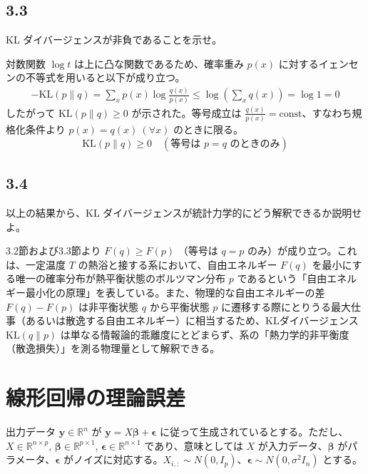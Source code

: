 \documentclass[11pt,a4paper,dvipdfmx]{article}
\numberwithin{equation}{section}
\newenvironment{note}[0]
{
    \begin{tcolorbox}[sharp corners, colframe=gray!20, colback=gray!20, width=\textwidth]
}
{
    \end{tcolorbox}
}
\begin{document}
\subsection*{3.3}
\begin{note}
KL ダイバージェンスが非負であることを示せ。
\end{note}
\begin{proofbox}
対数関数 $\log t$ は上に凸な関数であるため、確率重み $p(x)$ に対するイェンセンの不等式を用いると以下が成り立つ。
\begin{align}
-\text{KL}(p \parallel q) = \sum_{x} p(x) \log \frac{q(x)}{p(x)} \le \log \left( \sum_{x} q(x) \right) = \log 1 = 0
\end{align}
したがって $\text{KL}(p \parallel q) \ge 0$ が示された。等号成立は $\frac{q(x)}{p(x)} = \text{const}$、すなわち規格化条件より $p(x) = q(x) \ (\forall x)$ のときに限る。
\begin{equation}
\text{KL}(p \parallel q) \ge 0 \quad (\text{等号は } p = q \text{ のときのみ})
\end{equation}
\end{proofbox}

\subsection*{3.4}
\begin{note}
以上の結果から、KL ダイバージェンスが統計力学的にどう解釈できるか説明せよ。
\end{note}
\begin{proofbox}
3.2節および3.3節より $F(q) \ge F(p)$ （等号は $q=p$ のみ）が成り立つ。これは、一定温度 $T$ の熱浴と接する系において、自由エネルギー $F(q)$ を最小にする唯一の確率分布が熱平衡状態のボルツマン分布 $p$ であるという「自由エネルギー最小化の原理」を表している。また、物理的な自由エネルギーの差 $F(q) - F(p)$ は非平衡状態 $q$ から平衡状態 $p$ に遷移する際にとりうる最大仕事（あるいは散逸する自由エネルギー）に相当するため、KLダイバージェンス $\text{KL}(q \parallel p)$ は単なる情報論的乖離度にとどまらず、系の「熱力学的非平衡度（散逸損失）」を測る物理量として解釈できる。
\end{proofbox}


\section{線形回帰の理論誤差}
\begin{note}
出力データ $\bm{y} \in \mathbb{R}^n$ が $\bm{y} = X\bm{\beta} + \bm{\epsilon}$ に従って生成されているとする。ただし、$X \in \mathbb{R}^{n \times p}$, $\bm{\beta} \in \mathbb{R}^{p \times 1}$, $\bm{\epsilon} \in \mathbb{R}^{n \times 1}$ であり、意味としては $X$ が入力データ、$\bm{\beta}$ がパラメータ、$\bm{\epsilon}$ がノイズに対応する。$X_{i,:} \sim N(0, I_p)$、$\bm{\epsilon} \sim N(0, \sigma^2 I_n)$ とする。
\end{note}
\end{document}
